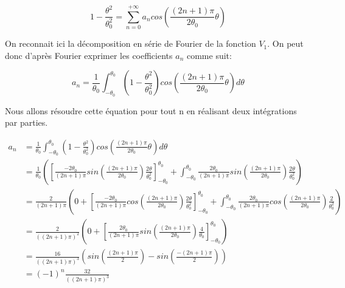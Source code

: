 \documentclass{article}
\begin{document}
\begin{equation}
    1 - \frac{\theta^2}{\theta_0^2}
    = \sum_{n=0}^{+\infty} a_n
    cos\left(\frac{(2n+1)\pi}{2\theta_0}\theta\right)
\end{equation}

On reconnait ici la décomposition en série de Fourier
de la fonction $V_1$. On peut donc d'après Fourier exprimer
les coefficients $a_n$ comme suit:

\begin{equation}
    a_n = \frac{1}{\theta_0}
    \int_{-\theta_0}^{\theta_0}
    \left(1 - \frac{\theta^2}{\theta_0^2}\right)
    cos\left(\frac{(2n+1)\pi}{2\theta_0}\theta\right) d\theta
\end{equation}

Nous allons résoudre cette équation pour tout n en réalisant
deux intégrations par parties.

\begin{align*}
    a_n & = \frac{1}{\theta_0}
        \int_{-\theta_0}^{\theta_0}
        \left(1 - \frac{\theta^2}{\theta_0^2}\right)
        cos\left(\frac{(2n+1)\pi}{2\theta_0}\theta\right)
        d\theta \\
        & = \frac{1}{\theta_0}
        \left(
            \left[ \frac{-2\theta_0}{(2n+1)\pi}
             sin\left(\frac{(2n+1)\pi}{2\theta_0}\right)
             \frac{2\theta}{\theta_0^2} \right]_{-\theta_0}^{\theta_0}
             + \int_{-\theta_0}^{\theta_0}
             \frac{2\theta_0}{(2n+1)\pi}
             sin\left(\frac{(2n+1)\pi}{2\theta_0}\right)
             \frac{2\theta}{\theta_0^2}
         \right) \\
        & = \frac{2}{(2n+1)\pi}
        \left( 0 +
            \left[ \frac{-2\theta_0}{(2n+1)\pi}
             cos\left(\frac{(2n+1)\pi}{2\theta_0}\right)
             \frac{2\theta}{\theta_0^2} \right]_{-\theta_0}^{\theta_0}
             + \int_{-\theta_0}^{\theta_0}
             \frac{2\theta_0}{(2n+1)\pi}
             cos\left(\frac{(2n+1)\pi}{2\theta_0}\right)
             \frac{2}{\theta_0^2}
         \right) \\
        & = \frac{2}{\left((2n+1)\pi\right)^2} 
        \left(0 +
            \left[\frac{2\theta_0}{(2n+1)\pi}
            sin\left(\frac{(2n+1)\pi}{2\theta_0}\right)
            \frac{4}{\theta_0}
             \right]_{-\theta_0}^{\theta_0}
         \right) \\
        & = \frac{16}{\left((2n+1)\pi\right)^3}
        \left(
            sin\left(\frac{(2n+1)\pi}{2}\right)
            - sin\left(\frac{-(2n+1)\pi}{2}\right)
        \right) \\
        & = \left(-1\right)^n \frac{32}{
            \left((2n+1)\pi\right)^3}
\end{align*}
\end{document}
